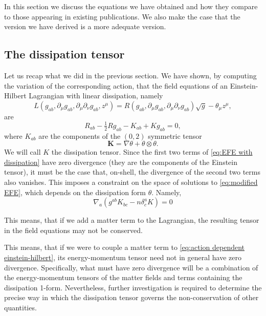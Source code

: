 \documentclass[../main.tex]{subfiles}
\begin{document}
In this section we discuss the equations we have obtained and how they compare to those
appearing in existing publications. We also make the case that the version we have derived
is a more adequate version. 

\subsection{The dissipation tensor}
Let us recap what we did in the previous section. We have shown, by computing the
variation of the corresponding action, that the field equations of an Einstein-Hilbert
Lagrangian with linear dissipation, namely
\begin{equation} 
	L(g_{ab}, \partial_\mu g_{ab}, \partial_\mu \partial_\nu g_{ab}, z^\mu) = R(g_{ab}, \partial_\mu g_{ab}, \partial_\mu \partial_\nu g_{ab})
	\sqrt{g} - \theta_\mu z^\mu,
\end{equation}
are
\begin{equation}\label{eq:EFE with dissipation}
   R_{ab} - \tfrac{1}{2}Rg_{ab} - K_{ab} + Kg_{ab} = 0,
\end{equation}
where \( K_{ab} \) are the components of the \( (0,2) \) symmetric tensor
\begin{equation}
	\mathbf{K} = \nabla \theta + \theta \otimes \theta.
\end{equation}
We will call \( K \) the dissipation tensor. Since the first two terms of \cref{eq:EFE with dissipation} have zero divergence (they are the components of the Einstein tensor), it must be the case that, on-shell, the divergence of the second two terms also vanishes. This imposes a constraint on the space of solutions to \cref{eq:modified EFE}, which depends on the dissipation form $\theta$. Namely,
\begin{equation}
\nabla_a\left(g^{ab}K_{bc}-n\delta^a_cK\right)=0
\end{equation}

This means, that if we add a matter term to the Lagrangian, the resulting  tensor in the field equations may not be conserved.

This means, that if we were to couple a matter term to \cref{eq:action dependent einstein-hilbert}, its energy-momentum tensor need not in general have zero divergence. Specifically, what must have zero divergence will be a combination of the energy-momentum tensors of the matter fields and terms containing the dissipation 1-form. Nevertheless, further investigation is required to determine the precise way in which the dissipation tensor governs the non-conservation of other quantities.
\end{document}
